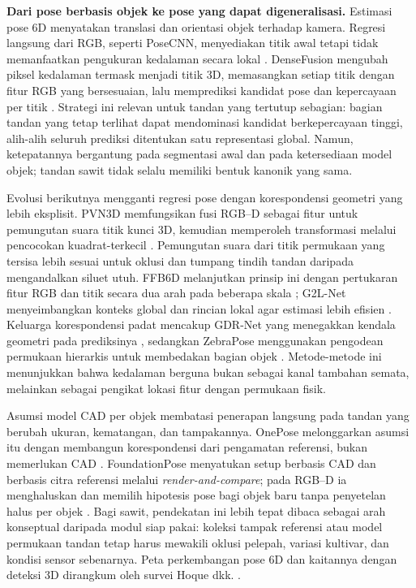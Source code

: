 \textbf{Dari pose berbasis objek ke pose yang dapat digeneralisasi.} Estimasi pose 6D menyatakan translasi dan orientasi objek terhadap kamera. Regresi langsung dari RGB, seperti PoseCNN, menyediakan titik awal tetapi tidak memanfaatkan pengukuran kedalaman secara lokal \cite{xiang2018posecnn}. DenseFusion mengubah piksel kedalaman termask menjadi titik 3D, memasangkan setiap titik dengan fitur RGB yang bersesuaian, lalu memprediksi kandidat pose dan kepercayaan per titik \cite{wang2019densefusion}. Strategi ini relevan untuk tandan yang tertutup sebagian: bagian tandan yang tetap terlihat dapat mendominasi kandidat berkepercayaan tinggi, alih-alih seluruh prediksi ditentukan satu representasi global. Namun, ketepatannya bergantung pada segmentasi awal dan pada ketersediaan model objek; tandan sawit tidak selalu memiliki bentuk kanonik yang sama.

Evolusi berikutnya mengganti regresi pose dengan korespondensi geometri yang lebih eksplisit. PVN3D memfungsikan fusi RGB--D sebagai fitur untuk pemungutan suara titik kunci 3D, kemudian memperoleh transformasi melalui pencocokan kuadrat-terkecil \cite{he2020pvn3d}. Pemungutan suara dari titik permukaan yang tersisa lebih sesuai untuk oklusi dan tumpang tindih tandan daripada mengandalkan siluet utuh. FFB6D melanjutkan prinsip ini dengan pertukaran fitur RGB dan titik secara dua arah pada beberapa skala \cite{he2021ffb6d}; G2L-Net menyeimbangkan konteks global dan rincian lokal agar estimasi lebih efisien \cite{chen2020g2lnet}. Keluarga korespondensi padat mencakup GDR-Net yang menegakkan kendala geometri pada prediksinya \cite{wang2021gdrnet}, sedangkan ZebraPose menggunakan pengodean permukaan hierarkis untuk membedakan bagian objek \cite{su2022zebrapose}. Metode-metode ini menunjukkan bahwa kedalaman berguna bukan sebagai kanal tambahan semata, melainkan sebagai pengikat lokasi fitur dengan permukaan fisik.

Asumsi model CAD per objek membatasi penerapan langsung pada tandan yang berubah ukuran, kematangan, dan tampakannya. OnePose melonggarkan asumsi itu dengan membangun korespondensi dari pengamatan referensi, bukan memerlukan CAD \cite{sun2022onepose}. FoundationPose menyatukan setup berbasis CAD dan berbasis citra referensi melalui \textit{render-and-compare}; pada RGB--D ia menghaluskan dan memilih hipotesis pose bagi objek baru tanpa penyetelan halus per objek \cite{wen2024foundationpose}. Bagi sawit, pendekatan ini lebih tepat dibaca sebagai arah konseptual daripada modul siap pakai: koleksi tampak referensi atau model permukaan tandan tetap harus mewakili oklusi pelepah, variasi kultivar, dan kondisi sensor sebenarnya. Peta perkembangan pose 6D dan kaitannya dengan deteksi 3D dirangkum oleh survei Hoque dkk. \cite{hoque2021posesurvey}.

